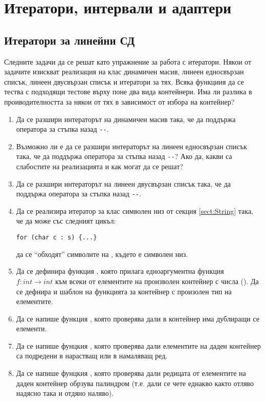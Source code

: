 \section {Итератори, интервали и адаптери}
\subsection {Итератори за линейни СД}
\label{iterators1}
Следните задачи да се решат като упражнение за работа с итератори. Някои от задачите изискват реализация на клас динамичен масив, линеен едносвързан списък, линеен двусвързан списък и  итератори за тях. Всяка функциия да се тества с подходящи тестове върху поне два вида контейнери. Има ли разлика в проиводителността за някои от тях в зависимост от избора на контейнер?


\begin{enumerate}

	\item Да се разшири интераторът на динамичен масив така, че да поддържа оператора за стъпка назад \texttt{-{}-}.

  \item Възможно ли е да се разшири интераторът на линеен едносвързан списък така, че да поддържа оператора за стъпка назад \texttt{-{}-}? Ако да, какви са слабостите на реализацията и как могат да се решат?

  \item Да се разшири интераторът на линеен двусвързан списък така, че да поддържа оператора за стъпка назад \texttt{-{}-}.

  \item Да се реализира итератор за клас символен низ от секция \ref{sect:String} така, че да може със следният цикъл:
  
\begin{verbatim}
for (char c : s) {...}
\end{verbatim}

  да се ``обходят'' символите на , където  е символен низ.

	\item  Да се дефинира функция , която прилага едноаргументна функция $f:int \rightarrow int$ към всеки от елементите на произволен контейнер с числа (). Да се дефнира и шаблон на функцията за контейнер с произолен тип на елементите.

	\item Да се напише функция , която проверява дали в контейнер има дублиращи се елементи.

	\item Да се напише фунцкия , която проверява дали елементите на даден контейнер са подредени в нарастващ или в намаляващ ред.

	\item Да се напише фунцкия , която проверява дали редицата от елементите на даден контейнер обрзува палиндром (т.е. дали се чете еднакво както отляво надясно така и отдяно наляво).
    
\end{enumerate}

